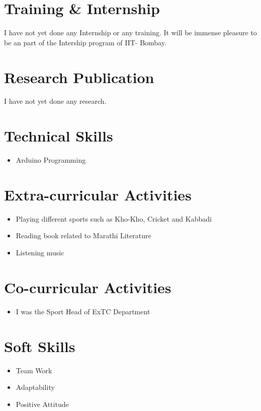 \documentclass[margin]{res}
\begin{document}
\begin{resume}
\section{Training \& Internship} I have not yet done any Internship or any training. It will be immense pleasure to be an part of the Intership program of IIT- Bombay.

\section{Research Publication} I have not yet done any research.\\ 
 
\section{Technical Skills}
\begin{itemize} \itemsep -2pt  %
\item Arduino Programming
\end{itemize}

\section{Extra-curricular Activities}
\begin{itemize} \itemsep -2pt  %
\item Playing different sports such as Kho-Kho, Cricket and Kabbadi
\item Reading book related to Marathi Literature
\item Listening music
\end{itemize}

\section{Co-curricular Activities}
\begin{itemize} \itemsep -2pt %
\item I was the Sport Head of ExTC Department
\end{itemize}


\section{Soft Skills}
\begin{itemize} \itemsep -2pt %
\item Team Work
\item Adaptability
\item Positive Attitude
\end{itemize}


\end{resume}
\end{document}
